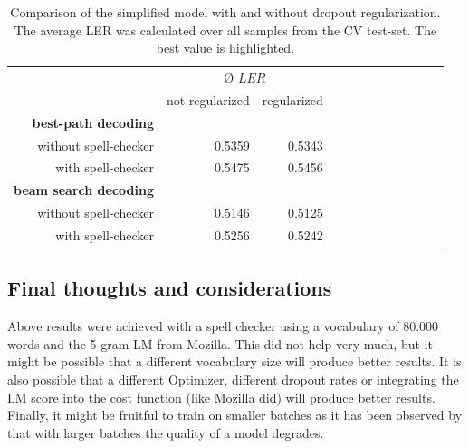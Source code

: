 \begin{table}\centering
	\begin{tabular}{@{}rrrrcrrrcrrr@{}}\toprule
		& \multicolumn{2}{c}{Ø $LER$} \\
		\cmidrule{2-3}
		& not regularized & regularized\\ \midrule
		\textbf{best-path decoding}\\
		without spell-checker & 0.5359 & 0.5343 \\
		with spell-checker & 0.5475 & 0.5456 \\
		\textbf{beam search decoding}\\
		without spell-checker & 0.5146 & \cellcolor{green!25}0.5125 \\
		with spell-checker & 0.5256 & 0.5242 \\
		\bottomrule
	\end{tabular}
	\caption{Comparison of the simplified model with and without dropout regularization. The average \ac{LER} was calculated over all samples from the \ac{CV} test-set. The best value is highlighted.}
	\label{comparison_regularized_unregularized}
\end{table}



\subsection{Final thoughts and considerations}

Above results were achieved with a spell checker using a vocabulary of 80.000 words and the 5-gram \ac{LM} from Mozilla. This did not help very much, but it might be possible that a different vocabulary size will produce better results. It is also possible that a different Optimizer, different dropout rates or integrating the \ac{LM} score into the cost function (like Mozilla did) will produce better results. Finally, it might be fruitful to train on smaller batches as it has been observed by \cite{batch_size_rnn} that with larger batches the quality of a model degrades. 

